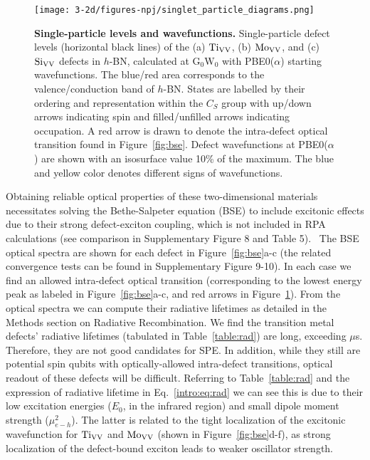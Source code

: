\begin{figure}[H]
    \centering
    \texttt{[image: 3-2d/figures-npj/singlet\_particle\_diagrams.png]}
    \caption{
    \textbf{Single-particle levels and wavefunctions.} Single-particle defect levels (horizontal black lines) of the (a) $\text{Ti}_{\text{V}\text{V}}$, (b) $\text{Mo}_{\text{V}\text{V}}$, and (c) $\text{Si}_{\text{V}\text{V}}$ defects in $h$-BN, calculated at $\mathrm{G_0W_0}$ with PBE0($\alpha$) starting wavefunctions. The blue/red area corresponds to the valence/conduction band of $h$-BN.
    States are labelled by their ordering and representation within the $C_S$ group with up/down arrows indicating spin and filled/unfilled arrows indicating occupation.
    A red arrow is drawn to denote the intra-defect optical transition found in Figure~\ref{fig:bse}.
    Defect wavefunctions at PBE0($\alpha$) are shown with an isosurface value 10\% of the maximum. The blue and yellow color denotes different signs of wavefunctions.
}
    \label{fig:sg_ctl}
\end{figure}

Obtaining reliable optical properties of these two-dimensional materials necessitates solving the Bethe-Salpeter equation (BSE)
to include excitonic effects due to their strong defect-exciton coupling, which is not included in RPA calculations (see comparison in Supplementary Figure 8 and Table 5).~\cite{ping20132electronic,rocca2012solution,ping2012ab,ping2013}
The BSE optical spectra are shown for each defect in Figure~\ref{fig:bse}a-c (the related convergence tests can be found in Supplementary Figure 9-10).
In each case we find an allowed intra-defect optical transition (corresponding to the lowest energy peak as labeled in Figure~\ref{fig:bse}a-c, and red arrows in Figure~\ref{fig:sg_ctl}).
From the optical spectra we can compute their radiative lifetimes as detailed in the Methods section on Radiative Recombination.
We find the transition metal defects' radiative lifetimes (tabulated in Table~\ref{table:rad}) are long, exceeding $\mu$s.
Therefore, they are not good candidates for SPE. In addition, while they still are potential spin qubits with optically-allowed intra-defect transitions, optical readout of these defects will be difficult.
Referring to Table~\ref{table:rad} and the expression of radiative lifetime in Eq.~\ref{intro:eq:rad} we can see this is due to their low excitation energies ($E_0$, in the infrared region) and small dipole moment strength ($\mu^2_{e-h}$). The latter is related to the tight localization of the excitonic wavefunction for $\text{Ti}_{\text{V}\text{V}}$ and $\text{Mo}_{\text{V}\text{V}}$ (shown in Figure~\ref{fig:bse}d-f), as strong localization of the defect-bound exciton leads to weaker oscillator strength.~\cite{hours2005exciton}

